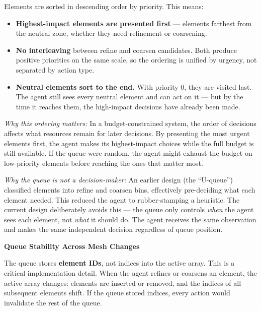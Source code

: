 \documentclass[11pt]{article}
\begin{document}
\vspace{0.15cm}
\noindent Elements are sorted in descending order by priority. This means:
\begin{itemize}[leftmargin=1.5em, itemsep=3pt]
    \item \textbf{Highest-impact elements are presented first} --- elements farthest from the neutral zone, whether they need refinement or coarsening.
    \item \textbf{No interleaving} between refine and coarsen candidates. Both produce positive priorities on the same scale, so the ordering is unified by urgency, not separated by action type.
    \item \textbf{Neutral elements sort to the end.} With priority 0, they are visited last. The agent still sees every neutral element and can act on it --- but by the time it reaches them, the high-impact decisions have already been made.
\end{itemize}

\noindent\textit{Why this ordering matters:} In a budget-constrained system, the order of decisions affects what resources remain for later decisions. By presenting the most urgent elements first, the agent makes its highest-impact choices while the full budget is still available. If the queue were random, the agent might exhaust the budget on low-priority elements before reaching the ones that matter most.

\vspace{0.15cm}
\noindent\textit{Why the queue is not a decision-maker:} An earlier design (the ``U-queue'') classified elements into refine and coarsen bins, effectively pre-deciding what each element needed. This reduced the agent to rubber-stamping a heuristic. The current design deliberately avoids this --- the queue only controls \textit{when} the agent sees each element, not \textit{what} it should do. The agent receives the same observation and makes the same independent decision regardless of queue position.

\vspace{0.5cm}
\noindent\textbf{\textcolor{roundcolor}{Queue Stability Across Mesh Changes}}

\vspace{0.15cm}
\noindent The queue stores \textbf{element IDs}, not indices into the active array. This is a critical implementation detail. When the agent refines or coarsens an element, the active array changes: elements are inserted or removed, and the indices of all subsequent elements shift. If the queue stored indices, every action would invalidate the rest of the queue.
\end{document}
